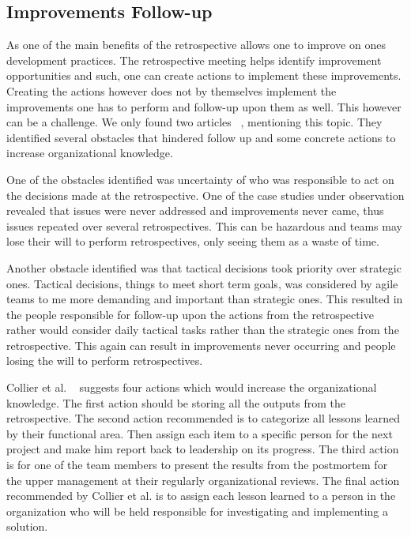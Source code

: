\documentclass[12pt]{article}
\begin{document}
\subsection{Improvements Follow-up}
As one of the main benefits of the retrospective allows one to improve on ones development practices. The retrospective meeting helps identify improvement opportunities  and such, one can create actions to implement these improvements. Creating the actions however does not by themselves implement the improvements one has to perform and follow-up upon them as well. This however can be a challenge. We only found two articles ~\cite{Drury2012, Collier1996}, mentioning this topic. They identified several obstacles that hindered follow up and some concrete actions to increase organizational knowledge. 

One of the obstacles identified was uncertainty of who was responsible to act on the decisions made at the retrospective. One of the case studies under observation revealed that issues were never addressed and improvements never came, thus issues repeated over several retrospectives. This can be hazardous and teams may lose their will to perform retrospectives, only seeing them as a waste of time. 

Another obstacle identified was that tactical decisions took priority over strategic ones. Tactical decisions, things to meet short term goals, was considered by agile teams to me more demanding and important than strategic ones. This resulted in the people responsible for follow-up upon the actions from the retrospective rather would consider daily tactical tasks rather than the strategic ones from the retrospective. This again can result in improvements never occurring and people losing the will to perform retrospectives. 

Collier et al. ~\cite{Collier1996} suggests four actions which would increase the organizational knowledge. The first action should be storing all the outputs from the retrospective. The second action recommended is to categorize all lessons learned by their functional area. Then assign each item to a specific person for the next project and make him report back to leadership on its progress. The third action is for one of the team members to present the results from the postmortem for the upper management at their regularly organizational reviews. The final action recommended by Collier et al. is to assign each lesson learned to a person in the organization who will be held responsible for investigating and implementing a solution. 
\end{document}
